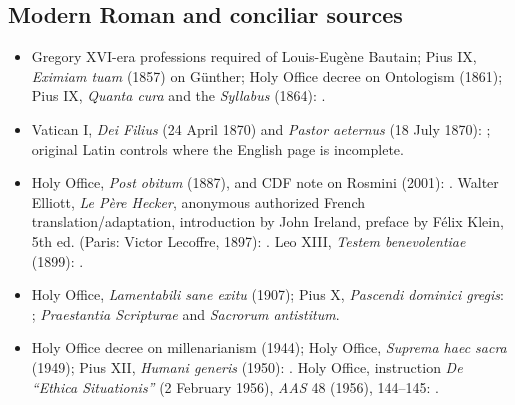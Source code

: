 \subsection{Modern Roman and conciliar sources}

\begin{itemize}
  \item Gregory XVI-era professions required of Louis-Eug\`ene Bautain; Pius IX, \emph{Eximiam tuam} (1857) on G\"unther; Holy Office decree on Ontologism (1861); Pius IX, \emph{Quanta cura} and the \emph{Syllabus} (1864): .
  \item Vatican I, \emph{Dei Filius} (24 April 1870) and \emph{Pastor aeternus} (18 July 1870): ; original Latin controls where the English page is incomplete.
  \item Holy Office, \emph{Post obitum} (1887), and CDF note on Rosmini (2001): . Walter Elliott, \emph{Le P\`ere Hecker}, anonymous authorized French translation/adaptation, introduction by John Ireland, preface by F\'elix Klein, 5th ed. (Paris: Victor Lecoffre, 1897): . Leo XIII, \emph{Testem benevolentiae} (1899): .
  \item Holy Office, \emph{Lamentabili sane exitu} (1907); Pius X, \emph{Pascendi dominici gregis}: ; \emph{Praestantia Scripturae} and \emph{Sacrorum antistitum}.
  \item Holy Office decree on millenarianism (1944); Holy Office, \emph{Suprema haec sacra} (1949); Pius XII, \emph{Humani generis} (1950): . Holy Office, instruction \emph{De ``Ethica Situationis''} (2 February 1956), \emph{AAS} 48 (1956), 144--145: .

\end{itemize}
